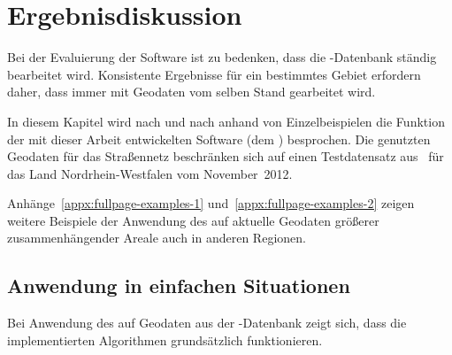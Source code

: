 \documentclass[../main/thesis.tex]{subfiles}
\begin{document}
\chapter{Ergebnisdiskussion}
\label{ch:result}


Bei der Evaluierung der Software ist zu bedenken, dass die \osm-Datenbank ständig bearbeitet wird.
Konsistente Ergebnisse für ein bestimmtes Gebiet erfordern daher, dass immer mit Geodaten vom selben Stand gearbeitet wird.

In diesem Kapitel wird nach und nach anhand von Einzelbeispielen die Funktion der mit dieser Arbeit entwickelten Software (dem ) besprochen.
Die genutzten Geodaten für das Straßennetz beschränken sich auf einen Testdatensatz aus \osm\ für das Land Nordrhein-Westfalen vom November~2012.

Anhänge~\ref{appx:fullpage-examples-1} und~\ref{appx:fullpage-examples-2} zeigen weitere Beispiele der Anwendung des  auf aktuelle Geodaten größerer zusammenhängender Areale auch in anderen Regionen.



\section{Anwendung in einfachen Situationen}
\label{ch:result-trivial}

Bei Anwendung des  auf Geodaten aus der \osm-Datenbank zeigt sich, dass die implementierten Algorithmen grundsätzlich funktionieren.

\end{document}
